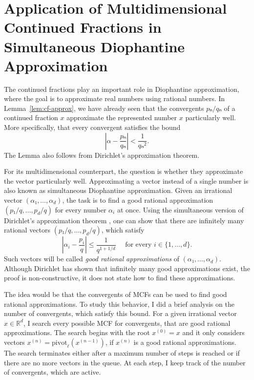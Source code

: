 \section{Application of Multidimensional Continued Fractions in Simultaneous Diophantine Approximation}

The continued fractions play an important role in Diophantine approximation,
where the goal is to approximate real numbers using rational numbers.
In Lemma~\vref{lem:cf-approx}, we have already seen that the convergents
$pₙ/qₙ$ of a continued fraction $x$ approximate the represented number $x$
particularly well.
More specifically, that every convergent satisfies the bound
\[
  \left|α - \frac{pₙ}{qₙ}\right| < \frac{1}{qₙ^2}.
\]
The Lemma also follows from Dirichlet's approximation theorem.

For its multidimensional counterpart,
the question is whether they approximate the vector particularly well.
Approximating a vector instead of a single number is also known as simultaneous
Diophantine approximation.
Given an irrational vector $(α₁, …, α_d)$, the task is to find a good
rational approximation $(p₁/q, …, p_d/q)$ for every number $α_i$ at once.
Using the simultaneous version of Dirichlet's approximation theorem \cite{Schmidt80},
one can show that there are infinitely many rational vectors $(p₁/q, …, p_d/q)$,
which satisfy
\begin{equation}
  \label{eq:sim-approx}
  \left|α_i - \frac{p_i}{q}\right| ≤ \frac{1}{q^{1 + 1/d}}
  \quad
  \text{ for every } i ∈ \{1, …, d\}.
\end{equation}
Such vectors will be called \emph{good rational approximations} of $(α₁, …, α_d)$.
Although Dirichlet has shown that infinitely many good approximations exist,
the proof is non-constructive, it does not state how to find these approximations.

The idea would be that the convergents of MCFs can be used to find good
rational approximations.
To study this behavior, I did a brief analysis on the number of convergents,
which satisfy this bound.
For a given irrational vector $x ∈ ℝ^d$,
I search every possible MCF for convergents, that are good rational approximations.
The search begins with the root $x^{(0)} = x$ and
it only considers vectors $x^{(n)} = \mathrm{pivot}_ℓ(x^{(n-1)})$,
if $x^{(n)}$ is a good rational approximations.
The search terminates either after a maximum number of steps is reached or if
there are no more vectors in the queue.
At each step, I keep track of the number of convergents,
which are active.

